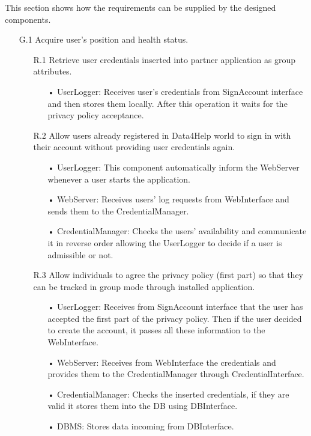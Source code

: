 \noindent
This section shows how the requirements can be supplied by the designed components.

\begin{enumerate}

\item [G.1] Acquire user’s position and health status.
	\begin{enumerate}
	\item [ R.1] Retrieve user credentials inserted into partner application as group attributes.
		\begin{enumerate}
		\item[•] UserLogger: Receives user's credentials from SignAccount interface and then stores them locally. After this operation it waits for the privacy policy acceptance.
		\end{enumerate}
		
		\item [R.2] Allow users already registered in Data4Help world to sign in with their account without providing user credentials again.
		\begin{enumerate}
		\item[•] UserLogger: This component automatically inform the WebServer whenever a user starts the application.
		\item[•] WebServer: Receives users' log requests from WebInterface and sends them to the CredentialManager.
		\item[•] CredentialManager: Checks the users' availability and communicate it in reverse order allowing the UserLogger to decide if a user is admissible or not.
		\end{enumerate}

	\item [ R.3] Allow individuals to agree the privacy policy (first part) so that they can be tracked in group mode through installed application.  
		\begin{enumerate}
		\item[•] UserLogger: Receives from SignAccount interface that the user has accepted the first part of the privacy policy. Then if the user decided to create the account, it passes all these information to the WebInterface.
		\item[•] WebServer: Receives from WebInterface the credentials and provides them to the CredentialManager through CredentialInterface.
		\item[•] CredentialManager: Checks the inserted credentials, if they are valid it stores them into the DB using DBInterface.
		\item[•] DBMS: Stores data incoming from DBInterface.
		\end{enumerate}
	

\end{enumerate}
\end{enumerate}
